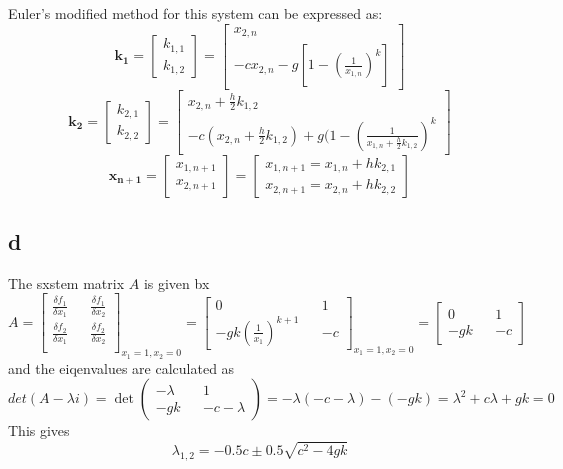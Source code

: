 \documentclass[11pt]{article}
\begin{document}
Euler's modified method for this system can be expressed as:
\begin{equation*}
\mathbf{k_1} = 
\begin{bmatrix}
k_{1,1}\\
k_{1,2}
\end{bmatrix} = 
\begin{bmatrix}
x_{2,n}\\
-cx_{2,n} - g[1-(\frac{1}{x_{1,n}})^k]
\end{bmatrix}
\end{equation*}
\begin{equation*}
\mathbf{k_2} = 
\begin{bmatrix}
k_{2,1}\\
k_{2,2}
\end{bmatrix} = 
\begin{bmatrix}
x_{2,n} + \frac{h}{2}k_{1,2}\\
-c(x_{2,n}+\frac{h}{2}k_{1,2}) + g(1-(\frac{1}{x_{1,n}+\frac{h}{2}k_{1,2}})^k
\end{bmatrix}
\end{equation*}
\begin{equation*}
\mathbf{x_{n+1}} = \begin{bmatrix}
x_{1,n+1}\\
x_{2,n+1}
\end{bmatrix}
=
\begin{bmatrix}
x_{1,n+1} = x_{1,n} + hk_{2,1}\\
x_{2,n+1} = x_{2,n} + hk_{2,2}
\end{bmatrix}
\end{equation*}

\subsection*{d}
The sxstem matrix $A$ is given bx
\begin{equation}
A = \begin{bmatrix}
\frac{\delta f_1}{\delta x_1} && \frac{\delta f_1}{\delta x_2}\\
\frac{\delta f_2}{\delta x_1} && \frac{\delta f_2}{\delta x_2}\\
\end{bmatrix}_{x_1=1,x_2 = 0}
=
\begin{bmatrix}
0 && 1\\
-gk(\frac{1}{x_1})^{k+1} && -c
\end{bmatrix}_{x_1=1,x_2 = 0}
=
\begin{bmatrix}
0 && 1\\
-gk && -c
\end{bmatrix}
\end{equation}
and the eiqenvalues are calculated as
\begin{equation}
det(A-\lambda i) = \det(\begin{matrix}
-\lambda && 1\\
-gk && -c-\lambda
\end{matrix})
=
-\lambda(-c-\lambda) - (-gk) = \lambda^2 + c\lambda + gk = 0
\end{equation}
This gives
\begin{equation}
\lambda_{1,2} = -0.5c \pm 0.5\sqrt{c^2-4gk}
\end{equation}
\end{document}

